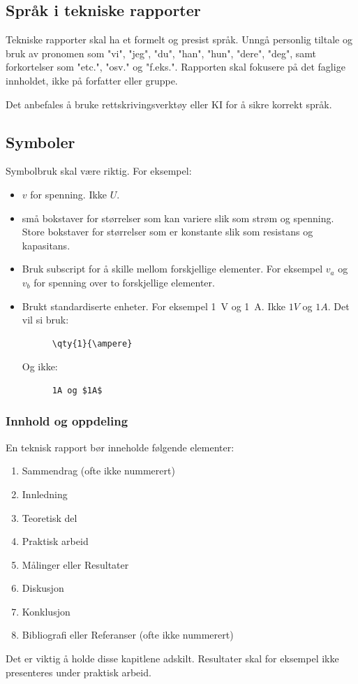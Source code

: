 \documentclass[11pt,a4paper,twocolumn]{article}
\begin{document}
\subsection{Språk i tekniske rapporter}
Tekniske rapporter skal ha et formelt og presist språk. Unngå personlig tiltale og bruk av pronomen som "vi", "jeg", "du", "han", "hun", "dere", "deg", samt forkortelser som "etc.", "osv." og "f.eks.". Rapporten skal fokusere på det faglige innholdet, ikke på forfatter eller gruppe.

Det anbefales å bruke rettskrivingsverktøy eller KI for å sikre korrekt språk.

\subsection{Symboler}
Symbolbruk skal være riktig. For eksempel:
  \begin{itemize}
    \item $v$ for spenning. Ikke $U$.
    \item små bokstaver for størrelser som kan variere slik som strøm og spenning. Store bokstaver for størrelser som er konstante slik som resistans og kapasitans.
    \item Bruk subscript for å skille mellom forskjellige elementer. For eksempel $v_a$ og $v_b$ for spenning over to forskjellige elementer.
    \item Brukt standardiserte enheter. For eksempel \qty{1}{\volt} og \qty{1}{\ampere}. Ikke $1V$ og $1A$. Det vil si bruk:
    \begin{verbatim}
      \qty{1}{\ampere}
    \end{verbatim}
    Og ikke:
    \begin{verbatim}
      1A og $1A$
    \end{verbatim}
  \end{itemize}

\subsubsection{Innhold og oppdeling}
\small %
En teknisk rapport bør inneholde følgende elementer:
\begin{enumerate}[1)]
    \item[*] Sammendrag (ofte ikke nummerert)
    \item Innledning
    \item Teoretisk del
    \item Praktisk arbeid
    \item Målinger eller Resultater
    \item Diskusjon
    \item Konklusjon
    \item[*] Bibliografi eller Referanser (ofte ikke nummerert)
\end{enumerate}
\normalsize %
Det er viktig å holde disse kapitlene adskilt. Resultater skal for eksempel  ikke presenteres under praktisk arbeid.
\end{document}

